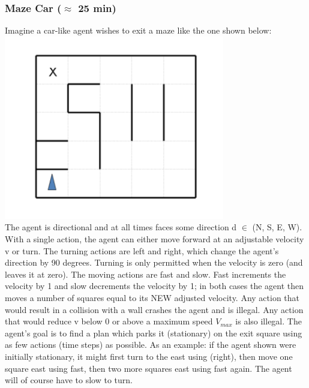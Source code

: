 \documentclass[a4paper, 10pt]{article}
\begin{document}
   \subsubsection{Maze Car ($\approx$ 25 min)}
Imagine a car-like agent wishes to exit a maze like the one shown below:
\\
\includegraphics[scale=1]{figures/tp1_maze.png}\\
The agent is directional and at all times faces some direction d $\in$ (N, S, E, W). With a single action, the agent
can either move forward at an adjustable velocity v or turn. The turning actions are left and right, which change
the agent’s direction by 90 degrees. Turning is only permitted when the velocity is zero (and leaves it at zero).
The moving actions are fast and slow. Fast increments the velocity by 1 and slow decrements the velocity by 1;
in both cases the agent then moves a number of squares equal to its NEW adjusted velocity. Any action that
would result in a collision with a wall crashes the agent and is illegal. Any action that would reduce v below 0
or above a maximum speed $V_{max}$ is also illegal. The agent’s goal is to find a plan which parks it (stationary)
on the exit square using as few actions (time steps) as possible.
As an example: if the agent shown were initially stationary, it might first turn to the east using (right), then
move one square east using fast, then two more squares east using fast again. The agent will of course have to
slow to turn.
\end{document}
